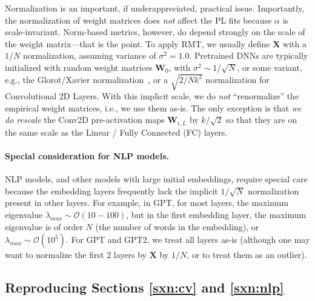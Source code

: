 Normalization is an important, if underappreciated, practical issue.
Importantly, the normalization of weight matrices does \emph{not} affect the PL fits because $\alpha$ is scale-invariant.
Norm-based metrics, however, do depend strongly on the scale of the weight matrix---that is the point.
To apply RMT, we usually define $\mathbf{X}$ with a $1/N$ normalization, assuming variance of $\sigma^{2}=1.0$.
Pretrained DNNs are typically initialized with random weight matrices $\mathbf{W}_{0}$, with
 $\sigma^{2}\sim 1/\sqrt{N}$, or some variant, e.g., the Glorot/Xavier normalization~\cite{GloBen10}, or a $\sqrt{2/Nk^2}$ normalization for Convolutional 2D Layers. With this implicit scale, 
we do \emph{not} ``renormalize'' the empirical weight matrices, i.e., we use them as-is.
The only exception is that \emph{we do rescale} the Conv2D pre-activation maps $\mathbf{W}_{i,L}$ 
by $k/\sqrt{2}$ so that they are on the same scale as the Linear / Fully Connected (FC) layers.


\paragraph{Special consideration for NLP models.}

NLP models, and other models with large initial embeddings, require special care because the embedding layers frequently lack the implicit $1/\sqrt{N}$ normalization present in other layers.
For example, in GPT, for most layers, the maximum eigenvalue $\lambda_{max}\sim\mathcal{O}(10-100)$, but in the first embedding layer, the maximum eigenvalue is of order $N$ (the number of words in the embedding), or $\lambda_{max}\sim\mathcal{O}(10^{5})$.  
For GPT and GPT2, we treat all layers as-is (although one may want to normalize the first 2 layers by  $\mathbf{X}$ by $1/N$, or to treat them as an outlier).


\subsection{Reproducing Sections \ref{sxn:cv} and \ref{sxn:nlp} }   %

